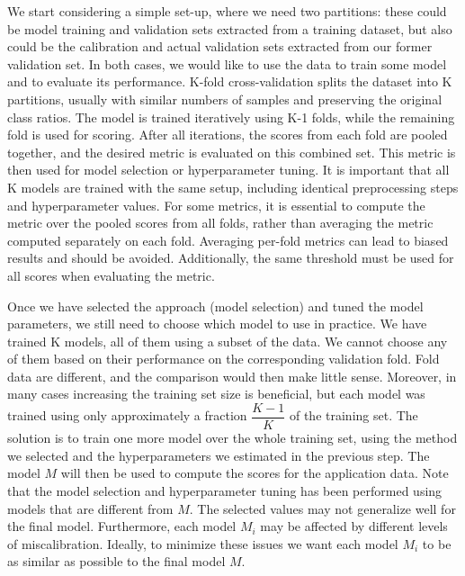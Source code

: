 We start considering a simple set-up, where we need two partitions: these could be model training and validation sets extracted from a training dataset, but also could be the calibration and actual validation sets extracted from our former validation set. In both cases, we would like to use the data to train some model and to evaluate its performance. K-fold cross-validation splits the dataset into K partitions, usually with similar numbers of samples and preserving the original class ratios. The model is trained iteratively using K-1 folds, while the remaining fold is used for scoring. After all iterations, the scores from each fold are pooled together, and the desired metric is evaluated on this combined set. This metric is then used for model selection or hyperparameter tuning. It is important that all K models are trained with the same setup, including identical preprocessing steps and hyperparameter values. For some metrics, it is essential to compute the metric over the pooled scores from all folds, rather than averaging the metric computed separately on each fold. Averaging per-fold metrics can lead to biased results and should be avoided. Additionally, the same threshold must be used for all scores when evaluating the metric.

Once we have selected the approach (model selection) and tuned the model parameters, we still need to choose which model to use in practice. We have trained K models, all of them using a subset of the data. We cannot choose any of them based on their performance on the corresponding validation fold. Fold data are different, and the comparison would then make little sense. Moreover, in many cases increasing the training set size is beneficial, but each model was trained using only approximately a fraction $\dfrac{K-1}{K}$ of the training set. The solution is to train one more model over the whole training set, using the method we selected and the hyperparameters we estimated in the previous step. The model $M$ will then be used to compute the scores for the application data. Note that the model selection and hyperparameter tuning has been performed using models that are different from $M$. The selected values may not generalize well for the final model. Furthermore, each model $M_i$ may be affected by different levels of miscalibration. Ideally, to minimize these issues we want each model $M_i$ to be as similar as possible to the final model $M$.

